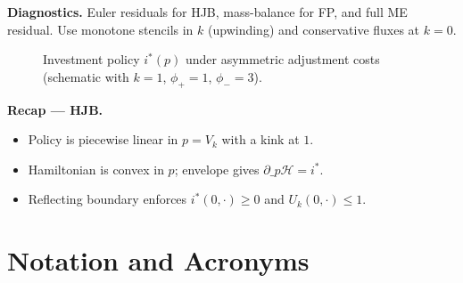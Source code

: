 ﻿\documentclass[11pt,letterpaper,oneside]{article}
\numberwithin{equation}{section}
\newcommand{\1}{\mathbf{1}}
\begin{document}
\begin{tcolorbox}[didacticstyle]
\textbf{Diagnostics.} Euler residuals for HJB, mass-balance for FP, and full ME residual. Use monotone stencils in $k$ (upwinding) and conservative fluxes at $k=0$.
\end{tcolorbox}

\begin{figure}[ht]
\centering
{}
\caption{Investment policy $i^*(p)$ under asymmetric adjustment costs (schematic with $k=1$, $\phi_+=1$, $\phi_-=3$).}
\end{figure}

\begin{tcolorbox}[didacticstyle]
\textbf{Recap --- HJB.}
\begin{itemize}[leftmargin=1.15em,itemsep=0.2em]
  \item Policy is piecewise linear in $p=V_k$ with a kink at $1$.
  \item Hamiltonian is convex in $p$; envelope gives $\partial\_p\mathcal H=i^*$.
  \item Reflecting boundary enforces $i^*(0,\cdot)\ge0$ and $U_k(0,\cdot)\le1$.
\end{itemize}
\end{tcolorbox}

\section{Notation and Acronyms}\label{sec:notation}
\end{document}
